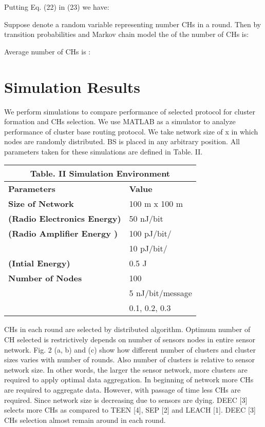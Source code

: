 \documentclass[10pt, conference, compsocconf]{IEEEtran}
\begin{document}
Putting Eq. (22) in (23) we have:



Suppose  denote a random variable representing number CHs in a round. Then by transition probabilities and Markov chain model the  of the number of CHs is:




Average number of CHs is :


\section{Simulation Results}
We perform simulations to compare performance of selected protocol for cluster formation and CHs selection. We use MATLAB as a simulator to analyze performance of cluster base routing protocol. We take network size of  x  in which  nodes are randomly distributed. BS is placed in any arbitrary position. All parameters taken for these simulations are defined in Table. II.

\vspace{0.5cm}
\begin{table}[!ht]
\begin{center}
\begin{tabular}{| p{3cm} || p{3cm} |}
  \multicolumn{2}{c}{Table. II Simulation Environment}\\
  \hline
  \textbf{Parameters} & \textbf{Value}   \\ \hline \hline
   \textbf{Size of Network	}&  100 m x 100 m	 \\ \hline
    \textbf{ (Radio Electronics Energy)}	&  50 nJ/bit	 \\ \hline
     \textbf{ (Radio Amplifier Energy )}& 100 pJ/bit/	 \\ \hline
       & 10 pJ/bit/	 \\ \hline
       \textbf{(Intial Energy)}	&  0.5 J	 \\ \hline
      \textbf{Number of Nodes}& 100	 \\ \hline
      	& 5 nJ/bit/message	 \\ \hline
      	& 0.1, 0.2, 0.3	 \\ \hline
\end{tabular}
\end{center}
\end{table}

CHs in each round are selected by distributed algorithm. Optimum number of CH selected is restrictively depends on number of sensors nodes in entire sensor network.  Fig. 2 (a, b)  and (c) show how different number of clusters and cluster sizes varies with number of rounds. Also number of clusters is relative to sensor network size. In other words, the larger the sensor network, more clusters are required to apply optimal data aggregation. In beginning of network more CHs are required to aggregate data. However, with passage of time less CHs are required. Since network size is decreasing due to sensors are dying.  DEEC [3] selects more CHs as compared to TEEN [4], SEP [2] and LEACH [1]. DEEC [3] CHs selection almost remain around  in each round.
\end{document}
